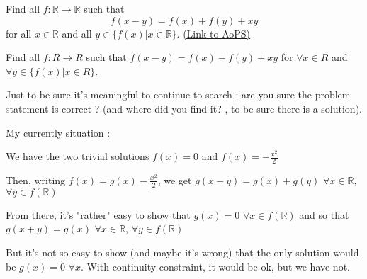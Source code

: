 \begin{problem}
	Find all $ f: \mathbb R\rightarrow \mathbb R$ such that \[ f(x-y) = f(x)+f(y)+xy\] for all $x\in \mathbb R$ and all $ y\in \{f(x) \vert x\in \mathbb R\}$.
	\flushright \href{https://artofproblemsolving.com/community/c6h296383}{(Link to AoPS)}
\end{problem}



\begin{solution}
	\begin{tcolorbox}Find all $ f: R\rightarrow R$ such that $ f(x - y) = f(x) + f(y) + xy$ for $ \forall x\in R$ and $ \forall y\in \{f(x) \vert x\in R\}$.\end{tcolorbox}

Just to be sure it's meaningful to continue to search : are you sure the problem statement is correct ? (and where did you find it? , to be sure there is a solution).

My currently situation :

We have the two trivial solutions $ f(x) = 0$ and $ f(x) = - \frac {x^2}2$

Then, writing $ f(x) = g(x) - \frac {x^2}2$, we get $ g(x - y) = g(x) + g(y)$ $ \forall x\in \mathbb R$, $ \forall y\in f(\mathbb R)$

From there, it's "rather" easy to show that $ g(x) = 0$ $ \forall x\in f(\mathbb R)$ and so that $ g(x + y) = g(x)$ $ \forall x\in \mathbb R$, $ \forall y\in f(\mathbb R)$

But it's not so easy to show (and maybe it's wrong) that the only solution would be $ g(x) = 0$ $ \forall x$. With continuity constraint, it would be ok, but we have not.
\end{solution}



